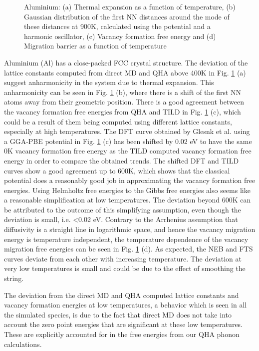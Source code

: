 \documentclass{article}
\begin{document}
\begin{figure}[!htp]
\caption{Aluminium: (a) Thermal expansion as a function of temperature, (b) Gaussian distribution of the first NN distances around the mode of these distances at 900K, calculated using the potential \cite{Mendelev2009a} and a harmonic oscillator, (c) Vacancy formation free energy and (d) Migration barrier as a function of temperature}
\label{fig:9}
\end{figure}

\noindent Aluminium (Al) has a close-packed FCC crystal structure. The deviation of the lattice constants computed from direct MD and QHA above 400K in Fig. \ref{fig:9} (a) suggest anharmonicity in the system due to thermal expansion. This anharmonicity can be seen in Fig. \ref{fig:9} (b), where there is a shift of the first NN atoms away from their geometric position. There is a good agreement between the vacancy formation free energies from QHA and TILD in Fig. \ref{fig:9} (c), which could be a result of them being computed using different lattice constants, especially at high temperatures. The DFT curve obtained by Glesnk et al. \cite{Glensk2013} using a GGA-PBE potential in Fig. \ref{fig:9} (c) has been shifted by 0.02 eV to have the same 0K vacancy formation free energy as the TILD computed vacancy formation free energy in order to compare the obtained trends. The shifted DFT and TILD curves show a good agreement up to 600K, which shows that the classical potential does a reasonably good job in approximating the vacancy formation free energies. Using Helmholtz free energies to the Gibbs free energies also seems like a reasonable simplification at low temperatures. The deviation beyond 600K can be attributed to the outcome of this simplifying assumption, even though the deviation is small, i.e. <0.02 eV. Contrary to the Arrhenius assumption that diffusivity is a straight line in logarithmic space, and hence the vacancy migration energy is temperature independent, the temperature dependence of the vacancy migration free energies can be seen in Fig. \ref{fig:9} (d). As expected, the NEB and FTS curves deviate from each other with increasing temperature. The deviation at very low temperatures is small and could be due to the effect of smoothing the string.

The deviation from the direct MD and QHA computed lattice constants and vacancy formation energies at low temperatures, a behavior which is seen in all the simulated species, is due to the fact that direct MD does not take into account the zero point energies that are significant at these low temperatures. These are explicitly accounted for in the free energies from our QHA phonon calculations.
\end{document}
